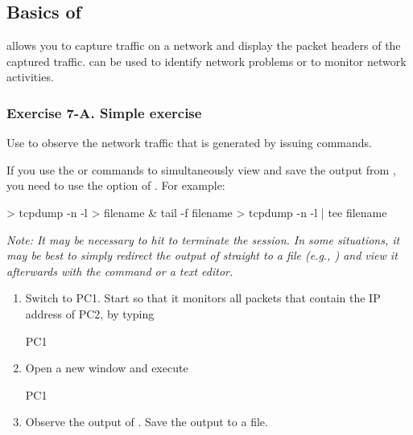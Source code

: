 \newpage
\subsection{Basics of }

 allows you to capture traffic on a network and display the packet headers of the captured traffic.  can be used to identify network problems or to monitor network activities.

\subsubsection*{Exercise 7-A. Simple  exercise}

Use  to observe the network traffic that is generated by issuing  commands.
\begin{framed}
	If you use the  or  commands to simultaneously view and save the output from , you need to use the  option of . For example:
	\begin{cmdblock}
	> tcpdump -n -l > filename & tail -f filename
	> tcpdump -n -l | tee filename
	\end{cmdblock}
	\emph{Note: It may be necessary to hit  to terminate the  session. In some situations, it may be best to simply redirect the output of  straight to a file (e.g., ) and view it afterwards with the  command or a text editor.}
\end{framed}

\begin{enumerate}
	\item Switch to PC1. Start  so that it monitors all packets that contain the IP address of PC2, by typing
		\begin{cmdblock}
	PC1%
		\end{cmdblock}
	\item Open a new window and execute
		\begin{cmdblock}
	PC1%
		\end{cmdblock}
	\item Observe the output of . Save the output to a file.
\end{enumerate}

\begin{questions}
\end{questions}

